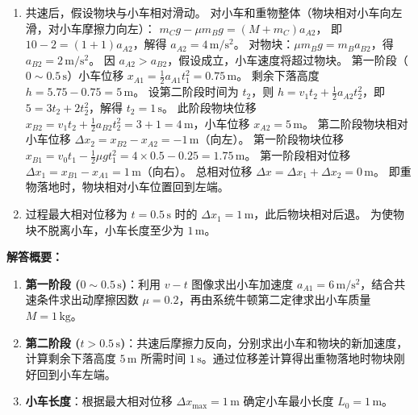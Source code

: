 \documentclass[CJKmath,a4paper,10pt]{ctexart}
\begin{document}
\begin{enumerate}[label=(\arabic*)]
\begin{align*}
		&T+f=M_A\times a_{A1}\\
		&代入T=4，f=2,a_{A1}=6得：M_A=1
	\end{align*}
	\item 共速后，假设物块与小车相对滑动。
	对小车和重物整体（物块相对小车向左滑，对小车摩擦力向左）：
	$ m_C g - \mu m_B g = (M + m_C) a_{A2} $，
	即 $ 10 - 2 = (1+1) a_{A2} $，解得 $ a_{A2} = 4\,\mathrm{m/s^2} $。
	对物块：$ \mu m_B g = m_B a_{B2} $，得 $ a_{B2} = 2\,\mathrm{m/s^2} $。
	因 $ a_{A2} > a_{B2} $，假设成立，小车速度将超过物块。
	第一阶段（$0 \sim 0.5\,\mathrm{s}$）小车位移 $ x_{A1} = \frac{1}{2} a_{A1} t_1^2 = 0.75\,\mathrm{m} $。
	剩余下落高度 $ h = 5.75 - 0.75 = 5\,\mathrm{m} $。
	设第二阶段时间为 $ t_2 $，则 $ h = v_1 t_2 + \frac{1}{2} a_{A2} t_2^2 $，即 $ 5 = 3 t_2 + 2 t_2^2 $，解得 $ t_2 = 1\,\mathrm{s} $。
	此阶段物块位移 $ x_{B2} = v_1 t_2 + \frac{1}{2} a_{B2} t_2^2 = 3 + 1 = 4\,\mathrm{m} $，小车位移 $ x_{A2} = 5\,\mathrm{m} $。
	第二阶段物块相对小车位移 $ \Delta x_2 = x_{B2} - x_{A2} = -1\,\mathrm{m} $（向左）。
	第一阶段物块位移 $ x_{B1} = v_0 t_1 - \frac{1}{2} \mu g t_1^2 = 4 \times 0.5 - 0.25 = 1.75\,\mathrm{m} $。
	第一阶段相对位移 $ \Delta x_1 = x_{B1} - x_{A1} = 1\,\mathrm{m} $（向右）。
	总相对位移 $ \Delta x = \Delta x_1 + \Delta x_2 = 0\,\mathrm{m} $。
	即重物落地时，物块相对小车位置回到左端。
	
	\item 过程最大相对位移为 $ t=0.5\,\mathrm{s} $ 时的 $ \Delta x_1 = 1\,\mathrm{m} $，此后物块相对后退。
	为使物块不脱离小车，小车长度至少为 $ 1\,\mathrm{m} $。
\end{enumerate}

\textbf{解答概要：}
\begin{enumerate}
    \item \textbf{第一阶段 ($0\sim 0.5\,\mathrm{s}$)}：利用 $v-t$ 图像求出小车加速度 $a_{A1}=6\,\mathrm{m/s^2}$，结合共速条件求出动摩擦因数 $\mu=0.2$，再由系统牛顿第二定律求出小车质量 $M=1\,\mathrm{kg}$。
    \item \textbf{第二阶段 ($t>0.5\,\mathrm{s}$)}：共速后摩擦力反向，分别求出小车和物块的新加速度，计算剩余下落高度 $5\,\mathrm{m}$ 所需时间 $1\,\mathrm{s}$。通过位移差计算得出重物落地时物块刚好回到小车左端。
    \item \textbf{小车长度}：根据最大相对位移 $\Delta x_{\max}=1\,\mathrm{m}$ 确定小车最小长度 $L_0=1\,\mathrm{m}$。
\end{enumerate}
\end{document}
